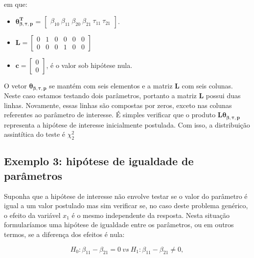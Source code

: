 \noindent em que:

\begin{itemize}
  
  \item $\boldsymbol{\theta_{\beta,\tau,p}^T}$ = $\begin{bmatrix} \beta_{10} \  \beta_{11} \ \beta_{20} \ \beta_{21} \ \tau_{11} \ \tau_{21} \end{bmatrix}$.


\item $\boldsymbol{L} = \begin{bmatrix} 0 & 1 & 0 & 0 & 0 & 0 \\
0 & 0 & 0 & 1 & 0 & 0 \end{bmatrix}$
 
\item $\boldsymbol{c} = \begin{bmatrix} 0 \\ 0 \end{bmatrix}$, é o valor sob hipótese nula. 

\end{itemize}

O vetor $\boldsymbol{\theta_{\beta,\tau,p}}$ se mantém com seis elementos e a matriz $\boldsymbol{L}$ com seis colunas. Neste caso estamos testando dois parâmetros, portanto a matriz $\boldsymbol{L}$ possui duas linhas. Novamente, essas linhas são compostas por zeros, exceto nas colunas referentes ao parâmetro de interesse. É simples verificar que o produto $\boldsymbol{L}\boldsymbol{\theta_{\beta,\tau,p}}$ representa a hipótese de interesse inicialmente postulada. Com isso, a distribuição assintítica do teste é $\chi^2_2$

\subsection{Exemplo 3: hipótese de igualdade de parâmetros}

Suponha que a hipótese de interesse não envolve testar se o valor do parâmetro é igual a um valor postulado mas sim verificar se, no caso deste problema genérico, o efeito da variável $x_1$ é o mesmo independente da resposta. Nesta situação formularíamos uma hipótese de igualdade entre os parâmetros, ou em outros termos, se a diferença dos efeitos é nula:

\begin{equation}
H_0: \beta_{11} - \beta_{21} = 0 \ vs \ H_1: \beta_{11} - \beta_{21} \neq 0,
\end{equation}

